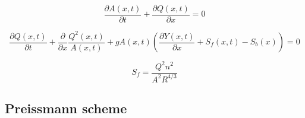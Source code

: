 \begin{equation}	
\frac{\partial A(x,t)}{\partial t} + \frac{\partial Q(x,t)}{\partial x}=0
\label{saintbernard_mass}
\end{equation}

\begin{equation}
	\frac{\partial Q(x,t)}{\partial t} + \frac{\partial}{\partial x} \frac{Q^2(x,t)}{A(x,t)}+ g A(x,t) (\frac{\partial Y(x,t)}{\partial x} +S_f(x,t)-S_b(x)) = 0
\label{saintbernard_momentum}
\end{equation}

\begin{equation}
	S_f = \frac{Q^2n^2}{A^2R^{4/3}}
\label{Manning_formula}
\end{equation}
\subsection{Preissmann scheme}\label{subse:preissmann_scheme}



